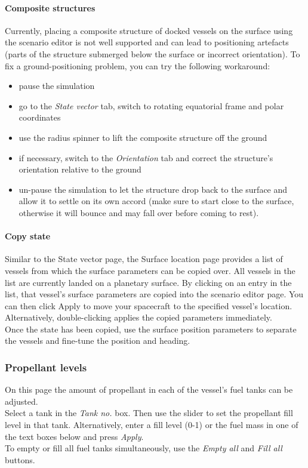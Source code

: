 \documentclass[Orbiter User Manual.tex]{subfiles}
\begin{document}
\paragraph{Composite structures}
Currently, placing a composite structure of docked vessels on the surface using the scenario editor is not well supported and can lead to positioning artefacts (parts of the structure submerged below the surface or incorrect orientation). To fix a ground-positioning problem, you can try the following workaround:

\begin{itemize}
\item pause the simulation
\item go to the \textit{State vector} tab, switch to rotating equatorial frame and polar coordinates
\item use the radius spinner to lift the composite structure off the ground
\item if necessary, switch to the \textit{Orientation} tab and correct the structure's orientation relative to the ground
\item un-pause the simulation to let the structure drop back to the surface and allow it to settle on its own accord (make sure to start close to the surface, otherwise it will bounce and may fall over before coming to rest).
\end{itemize}

\paragraph{Copy state}
Similar to the State vector page, the Surface location page provides a list of vessels from which the surface parameters can be copied over. All vessels in the list are currently landed on a planetary surface. By clicking on an entry in the list, that vessel's surface parameters are copied into the scenario editor page. You can then click Apply to move your spacecraft to the specified vessel's location. Alternatively, double-clicking applies the copied parameters immediately.\\
Once the state has been copied, use the surface position parameters to separate the vessels and fine-tune the position and heading.

\subsubsection{Propellant levels}
On this page the amount of propellant in each of the vessel's fuel tanks can be adjusted.\\
Select a tank in the \textit{Tank no.} box. Then use the slider to set the propellant fill level in that tank. Alternatively, enter a fill level (0-1) or the fuel mass in one of the text boxes below and press \textit{Apply}.\\
To empty or fill all fuel tanks simultaneously, use the \textit{Empty all} and \textit{Fill all} buttons.
\end{document}
